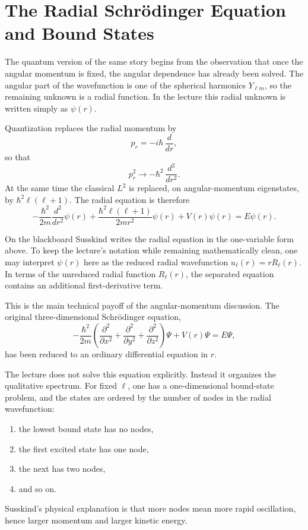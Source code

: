 \section{The Radial Schr\"odinger Equation and Bound States}

The quantum version of the same story begins from the observation that once the angular momentum is fixed, the angular dependence has already been solved. The angular part of the wavefunction is one of the spherical harmonics \(Y_{\ell m}\), so the remaining unknown is a radial function. In the lecture this radial unknown is written simply as \(\psi(r)\).

Quantization replaces the radial momentum by
\begin{equation}
p_r=-i\hbar\,\frac{d}{dr},
\end{equation}
so that
\begin{equation}
p_r^2\longrightarrow -\hbar^2\,\frac{d^2}{dr^2}.
\end{equation}
At the same time the classical \(L^2\) is replaced, on angular-momentum eigenstates, by \(\hbar^2\ell(\ell+1)\). The radial equation is therefore
\begin{equation}
-\frac{\hbar^2}{2m}\frac{d^2}{dr^2}\psi(r)
+\frac{\hbar^2\ell(\ell+1)}{2mr^2}\psi(r)
+V(r)\psi(r)
=
E\psi(r).
\end{equation}

\begin{remark}
On the blackboard Susskind writes the radial equation in the one-variable form above. To keep the lecture's notation while remaining mathematically clean, one may interpret \(\psi(r)\) here as the reduced radial wavefunction \(u_\ell(r)=rR_\ell(r)\). In terms of the unreduced radial function \(R_\ell(r)\), the separated equation contains an additional first-derivative term.
\end{remark}

This is the main technical payoff of the angular-momentum discussion. The original three-dimensional Schr\"odinger equation,
\begin{equation}
-\frac{\hbar^2}{2m}\left(\frac{\partial^2}{\partial x^2}
+\frac{\partial^2}{\partial y^2}
+\frac{\partial^2}{\partial z^2}\right)\Psi
+V(r)\Psi
=
E\Psi,
\end{equation}
has been reduced to an ordinary differential equation in \(r\).

The lecture does not solve this equation explicitly. Instead it organizes the qualitative spectrum. For fixed \(\ell\), one has a one-dimensional bound-state problem, and the states are ordered by the number of nodes in the radial wavefunction:
\begin{enumerate}
\item the lowest bound state has no nodes,
\item the first excited state has one node,
\item the next has two nodes,
\item and so on.
\end{enumerate}
Susskind's physical explanation is that more nodes mean more rapid oscillation, hence larger momentum and larger kinetic energy.

